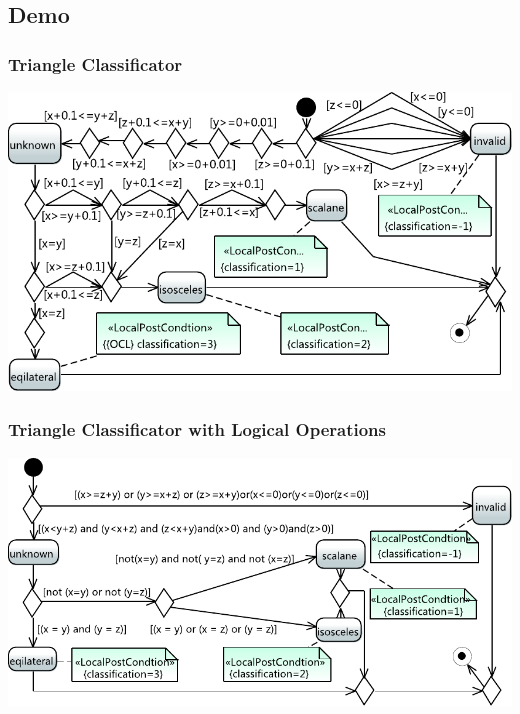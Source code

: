 \documentclass{beamer}
\begin{document}
\subsection{Demo}
\begin{frame}
\frametitle{Triangle Classificator}
% 
\includegraphics[width=\textwidth]{./pics/TriangleLin.pdf}
\end{frame}
\begin{frame}
\frametitle{Triangle Classificator with Logical Operations}
% 
\includegraphics[width=\textwidth]{./pics/TriangleClasivicator.pdf}
\end{frame}
\end{document}
